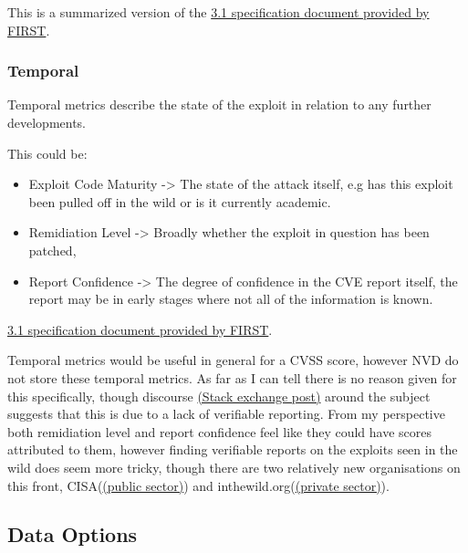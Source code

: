 \documentclass[12pt]{article}
\begin{document}
This is a summarized version of the \href{https://www.first.org/cvss/v3.1/specification-document}{3.1 specification document provided by FIRST}.


\subsubsection*{Temporal}

Temporal metrics describe the state of the exploit in relation to any further developments.

\bigskip

This could be:
\begin{itemize}

	\item Exploit Code Maturity -> The state of the attack itself, e.g has this exploit been pulled off in the wild or is it currently academic.

	\item Remidiation Level -> Broadly whether the exploit in question has been patched,

	\item Report Confidence -> The degree of confidence in the CVE report itself, the report may be in early stages where not all of the
	      information is known.

\end{itemize}

\href{https://www.first.org/cvss/v3.1/specification-document}{3.1 specification document provided by
	FIRST}.

Temporal metrics would be useful in general for a CVSS score, however NVD do not store these temporal metrics. As far as I can tell there is no reason
given for this specifically, though discourse
\href{https://security.stackexchange.com/questions/270257/cvss-v3-and-v3-1-missing-temporal-metrics-exploit-code-maturity-and-remediation }{(Stack
	exchange post)} around the subject suggests that this is due to a lack of verifiable reporting. From my perspective both remidiation level and report
confidence feel like they could have scores attributed to them, however finding verifiable reports on the exploits seen in the wild does seem more
tricky, though there are two relatively new organisations on this front,
CISA(\href{https://www.cisa.gov/known-exploited-vulnerabilities-catalog}{(public sector)}) and inthewild.org(\href{https://inthewild.io/}{(private
	sector)}).

\subsection{Data Options}
\end{document}
